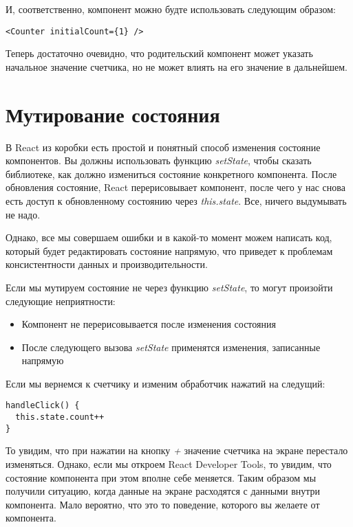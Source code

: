 И, соответственно, компонент можно будте использовать следующим образом:

\begin{lstlisting}
<Counter initialCount={1} />
\end{lstlisting}

Теперь достаточно очевидно, что родительский компонент может указать начальное значение счетчика, но не может влиять на его значение в дальнейшем.

\section{Мутирование состояния}

В React из коробки есть простой и понятный способ изменения состояние компонентов. Вы должны использовать функцию \textit{setState}, чтобы сказать библиотеке, как должно измениться состояние конкретного компонента. После обновления состояние, React перерисовывает компонент, после чего у нас снова есть доступ к обновленному состоянию через \textit{this.state}. Все, ничего выдумывать не надо.

Однако, все мы совершаем ошибки и в какой-то момент можем написать код, который будет редактировать состояние напрямую, что приведет к проблемам консистентности данных и производительности.

Если мы мутируем состояние не через функцию \textit{setState}, то могут произойти следующие неприятности:

\begin{itemize}
  \item Компонент не перерисовывается после изменения состояния
  \item После следующего вызова \textit{setState} применятся изменения, записанные напрямую
\end{itemize}

Если мы вернемся к счетчику и изменим обработчик нажатий на следущий:

\begin{lstlisting}
handleClick() {
  this.state.count++
}
\end{lstlisting}

То увидим, что при нажатии на кнопку \textit{+} значение счетчика на экране перестало изменяться. Однако, если мы откроем React Developer Tools, то увидим, что состояние компонента при этом вполне себе меняется. Таким образом мы получили ситуацию, когда данные на экране расходятся с данными внутри компонента. Мало вероятно, что это то поведение, которого вы желаете от компонента.

